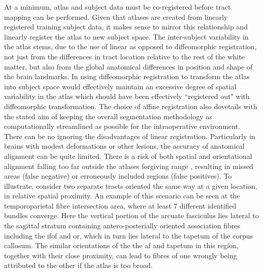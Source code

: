 At a minimum, atlas and subject data must be co-registered before tract mapping can be performed.
Given that atlases are created from linearly registered training subject data, it makes sense to mirror this relationship and linearly register the atlas to new subject space.
The inter-subject variability in the atlas stems, due to the use of linear as opposed to diffeomorphic registration, not just from the differences in tract location relative to the rest of the white matter, but also from the global anatomical differences in position and shape of the brain landmarks. 
In using diffeomorphic registration to transform the atlas into subject space would effectively maintain an excessive degree of spatial variability in the atlas which should have been effectively ``registered out" with diffeomorphic transformation.
The choice of affine registration also dovetails with the stated aim of keeping the overall segmentation methodology as computationally streamlined as possible for the intraoperative environment.
There can be no ignoring the disadvantages of linear registration.
Particularly in brains with modest deformations or other lesions, the accuracy of anatomical alignment can be quite limited.
There is a risk of both spatial and orientational alignment falling too far outside the atlases forgiving range , resulting in missed areas (false negative) or erroneously included regions (false positives).
To illustrate, consider two separate tracts oriented the same way at a given location, in relative spatial proximity.
An example of this scenario can be seen at the temporoparietal fibre intersection area, where at least 7 different  identified bundles converge.
Here the vertical portion of the arcuate fasciculus lies lateral to the sagittal stratum containing antero-posterially oriented association fibres including the \gls{ifof} and \gls{or}, which in turn lies lateral to the tapetum of the corpus callosum.
The similar orientations of the the \gls{af} and tapetum in this region, together with their close proximity, can lead to fibres of one wrongly being attributed to the other if the atlas is too broad.


